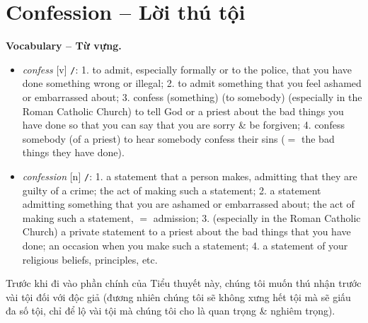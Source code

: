 \documentclass[12pt,oneside]{book}
\begin{document}
\section{Confession -- Lời thú tội}
\textbf{\textsf{\small Vocabulary -- Từ vựng.}}
\begin{itemize}\small\sf
	\item {\it confess} [v] {\tt/}: 1. to admit, especially formally or to the police, that you have done something wrong or illegal; 2. to admit something that you feel ashamed or embarrassed about; 3. {confess (something) (to somebody)} (especially in the Roman Catholic Church) to tell God or a priest about the bad things you have done so that you can say that you are sorry \& be forgiven; 4. {\sf confess somebody} (of a priest) to hear somebody confess their sins ($=$ the bad things they have done).
	\item {\it confession} [n] {\tt/}: 1. a statement that a person makes, admitting that they are guilty of a crime; the act of making such a statement; 2. a statement admitting something that you are ashamed or embarrassed about; the act of making such a statement, $=$ {\sf admission}; 3. (especially in the Roman Catholic Church) a private statement to a priest about the bad things that you have done; an occasion when you make such a statement; 4. a statement of your religious beliefs, principles, etc.
\end{itemize}
Trước khi đi vào phần chính của Tiểu thuyết này, chúng tôi muốn thú nhận trước vài tội đối với độc giả (đương nhiên chúng tôi sẽ không xưng hết tội mà sẽ giấu đa số tội, chỉ để lộ vài tội mà chúng tôi cho là quan trọng \& nghiêm trọng).
\end{document}

